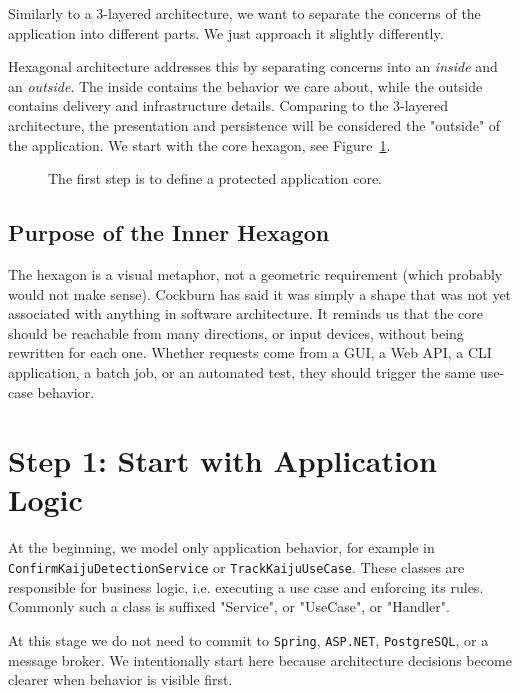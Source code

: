 Similarly to a 3-layered architecture, we want to separate the concerns of the application into different parts. We just approach it slightly differently.

Hexagonal architecture addresses this by separating concerns into an \textit{inside} and an \textit{outside}. The inside contains the behavior we care about, while the outside contains delivery and infrastructure details. Comparing to the 3-layered architecture, the presentation and persistence will be considered the "outside" of the application. We start with the core hexagon, see Figure~\ref{fig:hexagonal_core_only}.

\begin{figure}[htbp]
    \centering
    
    \caption{The first step is to define a protected application core.}
    \label{fig:hexagonal_core_only}
\end{figure}

\subsection{Purpose of the Inner Hexagon}
\label{sec:hexagonal_inner_purpose}

The hexagon is a visual metaphor, not a geometric requirement (which probably would not make sense). Cockburn has said it was simply a shape that was not yet associated with anything in software architecture. It reminds us that the core should be reachable from many directions, or input devices, without being rewritten for each one. Whether requests come from a GUI, a Web API, a CLI application, a batch job, or an automated test, they should trigger the same use-case behavior.


\section{Step 1: Start with Application Logic}
\label{sec:hexagonal_step1}

At the beginning, we model only application behavior, for example in \texttt{ConfirmKaijuDetectionService} or \texttt{TrackKaijuUseCase}. These classes are responsible for business logic, i.e. executing a use case and enforcing its rules. Commonly such a class is suffixed "Service", or "UseCase", or "Handler". 

At this stage we do not need to commit to \texttt{Spring}, \texttt{ASP.NET}, \texttt{PostgreSQL}, or a message broker. We intentionally start here because architecture decisions become clearer when behavior is visible first.

